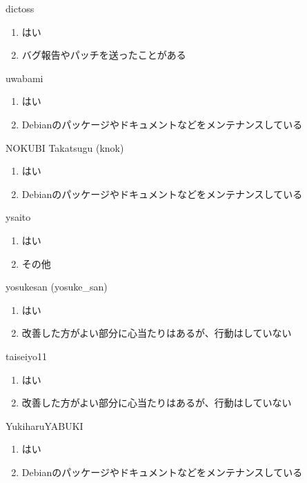 \begin{prework}{ dictoss }
  \begin{enumerate}
  \item はい
  \item バグ報告やパッチを送ったことがある
  \end{enumerate}
\end{prework}

\begin{prework}{ uwabami }
  \begin{enumerate}
  \item はい
  \item Debianのパッケージやドキュメントなどをメンテナンスしている
  \end{enumerate}
\end{prework}

\begin{prework}{ NOKUBI Takatsugu (knok) }
  \begin{enumerate}
  \item はい
  \item Debianのパッケージやドキュメントなどをメンテナンスしている
  \end{enumerate}
\end{prework}

\begin{prework}{ ysaito }
  \begin{enumerate}
  \item はい
  \item その他
  \end{enumerate}
\end{prework}

\begin{prework}{ yosukesan (yosuke\_san) }
  \begin{enumerate}
  \item はい
  \item 改善した方がよい部分に心当たりはあるが、行動はしていない
  \end{enumerate}
\end{prework}

\begin{prework}{ taiseiyo11 }
  \begin{enumerate}
  \item はい
  \item 改善した方がよい部分に心当たりはあるが、行動はしていない
  \end{enumerate}
\end{prework}

\begin{prework}{ YukiharuYABUKI }
  \begin{enumerate}
  \item はい
  \item Debianのパッケージやドキュメントなどをメンテナンスしている
  \end{enumerate}
\end{prework}

